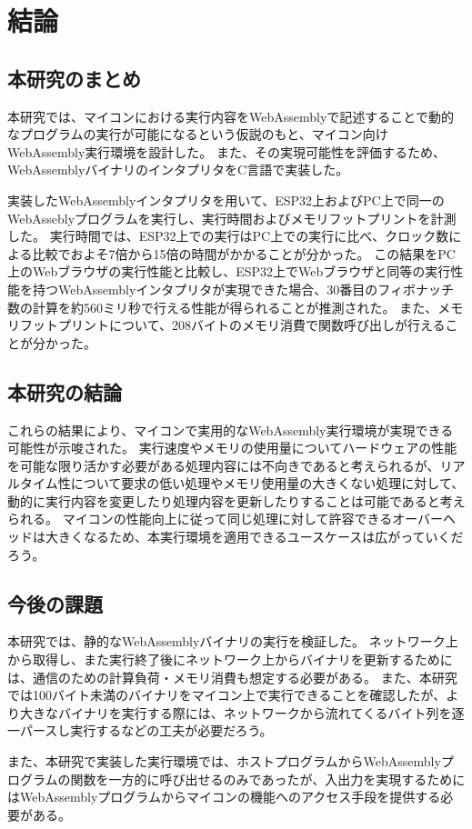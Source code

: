 \chapter{結論}
\label{chap:conclusion}

\section{本研究のまとめ}
\label{section:conclusion}

本研究では、マイコンにおける実行内容をWebAssemblyで記述することで動的なプログラムの実行が可能になるという仮説のもと、マイコン向けWebAssembly実行環境を設計した。
また、その実現可能性を評価するため、WebAssemblyバイナリのインタプリタをC言語で実装した。

実装したWebAssemblyインタプリタを用いて、ESP32上およびPC上で同一のWebAsseblyプログラムを実行し、実行時間およびメモリフットプリントを計測した。
実行時間では、ESP32上での実行はPC上での実行に比べ、クロック数による比較でおよそ7倍から15倍の時間がかかることが分かった。
この結果をPC上のWebブラウザの実行性能と比較し、ESP32上でWebブラウザと同等の実行性能を持つWebAssemblyインタプリタが実現できた場合、30番目のフィボナッチ数の計算を約560ミリ秒で行える性能が得られることが推測された。
また、メモリフットプリントについて、208バイトのメモリ消費で関数呼び出しが行えることが分かった。

\section{本研究の結論}

これらの結果により、マイコンで実用的なWebAssembly実行環境が実現できる可能性が示唆された。
実行速度やメモリの使用量についてハードウェアの性能を可能な限り活かす必要がある処理内容には不向きであると考えられるが、リアルタイム性について要求の低い処理やメモリ使用量の大きくない処理に対して、動的に実行内容を変更したり処理内容を更新したりすることは可能であると考えられる。
マイコンの性能向上に従って同じ処理に対して許容できるオーバーヘッドは大きくなるため、本実行環境を適用できるユースケースは広がっていくだろう。

\section{今後の課題}

本研究では、静的なWebAssemblyバイナリの実行を検証した。
ネットワーク上から取得し、また実行終了後にネットワーク上からバイナリを更新するためには、通信のための計算負荷・メモリ消費も想定する必要がある。
また、本研究では100バイト未満のバイナリをマイコン上で実行できることを確認したが、より大きなバイナリを実行する際には、ネットワークから流れてくるバイト列を逐一パースし実行するなどの工夫が必要だろう。

また、本研究で実装した実行環境では、ホストプログラムからWebAssemblyプログラムの関数を一方的に呼び出せるのみであったが、入出力を実現するためにはWebAssemblyプログラムからマイコンの機能へのアクセス手段を提供する必要がある。
